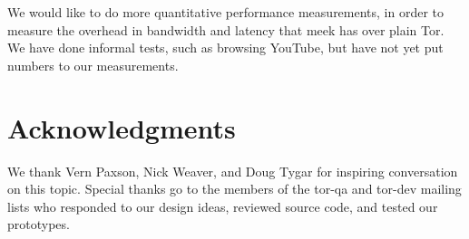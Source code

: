 \documentclass{article}
\begin{document}
We would like to do more quantitative performance measurements,
in order to measure the overhead in bandwidth and latency that meek has over plain Tor.
We have done informal tests, such as browsing YouTube,
but have not yet put numbers to our measurements.


\section{Acknowledgments}

We thank Vern Paxson, Nick Weaver, and Doug Tygar for inspiring conversation on this topic.
Special thanks go to the members of the tor-qa and tor-dev mailing lists
who responded to our design ideas, reviewed source code, and tested our prototypes.



  

\end{document}
